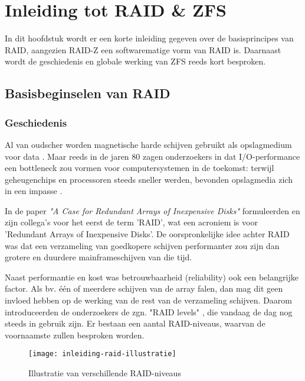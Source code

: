 

\chapter{Inleiding tot RAID \& ZFS}
\label{ch:h2}

In dit hoofdstuk wordt er een korte inleiding gegeven over de basisprincipes van RAID, aangezien RAID-Z een softwarematige vorm van RAID is. Daarnaast wordt de geschiedenis en globale werking van ZFS reeds kort besproken. 

\section{Basisbeginselen van RAID}

\subsection{Geschiedenis}

Al van oudscher worden magnetische harde schijven gebruikt als opslagmedium voor data \autocite{Goda2012}. Maar reeds in de jaren 80 zagen onderzoekers in dat I/O-performance een bottleneck zou vormen voor computersystemen in de toekomst: terwijl geheugenchips en processoren steeds sneller werden, bevonden opslagmedia zich in een impasse \autocite{DavidA.Paterson1987}.

In de paper \textit{"A Case for Redundant Arrays of Inexpensive Disks"}  formuleerden \textcite{DavidA.Paterson1987} en zijn collega's voor het eerst de term 'RAID', wat een acroniem is voor 'Redundant Arrays of Inexpensive Disks'. De oorspronkelijke idee achter RAID was dat een verzameling van goedkopere schijven performanter zou zijn dan grotere en duurdere mainframeschijven van die tijd. 

Naast performantie en kost was betrouwbaarheid (reliability)  ook een belangrijke factor. Als bv. één of meerdere schijven van de array falen, dan mag dit geen invloed hebben op de werking van de rest van de verzameling schijven. Daarom introduceerden de onderzoekers de zgn. "RAID levels"    \autocite{DavidA.Paterson1987}, die vandaag de dag nog steeds in gebruik zijn. Er bestaan een aantal RAID-niveaus, waarvan de voornaamste zullen besproken worden.

\begin{figure}
	\centering
	\texttt{[image: inleiding-raid-illustratie]}
	\caption{Illustratie van verschillende RAID-niveaus \autocite{Chen1994}}
	\label{fig:chen_array_illustratie}
\end{figure}

